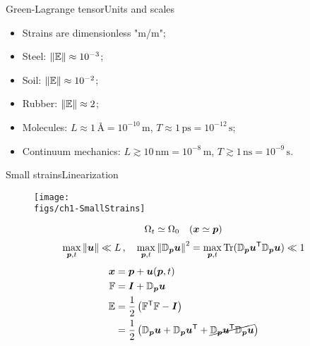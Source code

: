 \begin{frame}{Green-Lagrange tensor}{Units and scales}

\begin{itemize}
\item Strains are dimensionless "m/m";
\item Steel: $\left\|{\mathbb{E}}\right\|\approx10^{-3}$;
\item Soil: $\left\|{\mathbb{E}}\right\|\approx10^{-2}$;
\item Rubber: $\left\|{\mathbb{E}}\right\|\approx 2$;
\item Molecules: $L\approx 1\,\text{\AA}=10^{-10}\,\text{m}$, $T\approx1\,\text{ps}=10^{-12}\,\text{s}$;
\item Continuum mechanics: $L\gtrsim 10\,\text{nm}=10^{-8}\,\text{m}$, $T\gtrsim 1\,\text{ns}=10^{-9}\,\text{s}$.
\end{itemize}


\end{frame}

\begin{frame}{Small strains}{Linearization}

\begin{figure}
\centering\texttt{[image: \\figs/ch1-SmallStrains]}
\end{figure}
\begin{displaymath}
\Omega_t\simeq\Omega_0\quad({\boldsymbol{x}}\simeq{\boldsymbol{p}})
\end{displaymath}
\begin{displaymath}
\max_{{\boldsymbol{p}},t}\left\|{\boldsymbol{u}}\right\|\ll L\,,\quad\max_{{\boldsymbol{p}},t}\left\|{\mathbb D}_{\boldsymbol{p}}{\boldsymbol{u}}\right\|^2=\max_{{\boldsymbol{p}},t}\operatorname{Tr}({\mathbb D}_{\boldsymbol{p}}{\boldsymbol{u}}^{\sf T}{\mathbb D}_{\boldsymbol{p}}{\boldsymbol{u}})\ll 1
\end{displaymath}
\begin{displaymath}
\begin{split}
{\boldsymbol{x}} &={\boldsymbol{p}}+{\boldsymbol{u}}({\boldsymbol{p}},t) \\
{\mathbb F} &={\boldsymbol I}+{\mathbb D}_{\boldsymbol{p}}{\boldsymbol{u}} \\
{\mathbb{E}} &=\frac{1}{2}\left({\mathbb F}^{\sf T}{\mathbb F}-{\boldsymbol I}\right) \\
&=\frac{1}{2}\left({\mathbb D}_{\boldsymbol{p}}{\boldsymbol{u}}+{\mathbb D}_{\boldsymbol{p}}{\boldsymbol{u}}^{\sf T}+\cancel{{\mathbb D}_{\boldsymbol{p}}{\boldsymbol{u}}^{\sf T}{\mathbb D}_{\boldsymbol{p}}{\boldsymbol{u}}}\right)
\end{split}
\end{displaymath}

\end{frame}

